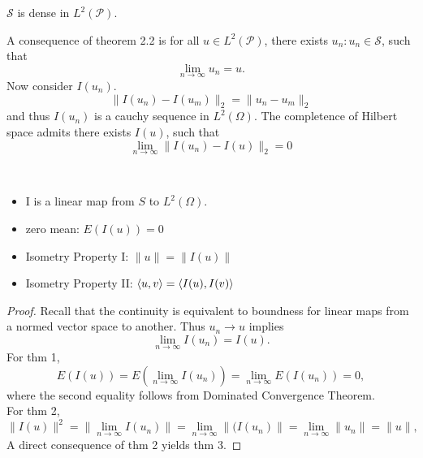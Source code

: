 \documentclass[12pt]{book}
\begin{document}
\begin{theorem}
$\mathcal S$ is dense in $L^2(\mathcal P)$.
\end{theorem}
\begin{remark}
A consequence of theorem 2.2 is for all $u \in L^2(\mathcal P)$, there exists ${u_n:u_n \in \mathcal S}$, such that 
$$
\lim_{n \to \infty} u_n = u.
$$
Now consider ${I(u_n)}$.
$$
\| I(u_n)-I(u_m)\|_2 = \| u_n - u_m\|_2
$$
and thus $I(u_n)$ is a cauchy sequence in $L^2(\Omega)$. The completence of Hilbert space admits there exists $I(u)$, such that 
$$
\lim_{n \to \infty} \| I(u_n) - I(u) \|_2 = 0
$$
\end{remark}


\begin{theorem} \ \\
\begin{itemize}
	\item I is a linear map from $S$ to $L^2(\Omega)$.
	\item zero mean: $E(I(u))=0$
	\item Isometry Property I: $\| u\| = \| I(u)\|$
	\item Isometry Property II: ${\langle u,v\rangle}={\langle I(u),I(v)\rangle}$
\end{itemize}
\end{theorem}
\begin{proof}
Recall that the continuity is equivalent to boundness for linear maps from a normed vector space to another. Thus $u_n \to u$ implies
$$
\lim_{n\to \infty} I(u_n) = I(u).
$$
For thm 1,
$$
E(I(u)) = E(\lim_{n\to \infty} I(u_n)) = \lim_{n \to \infty}E(I(u_n))=0,
$$	
where the second equality follows from Dominated Convergence Theorem. \\
For thm 2,
$$
\| I(u) \|^2 =  \|\lim_{n\to \infty} I(u_n) \| = \lim_{n \to \infty}\|(I(u_n)\|=\lim_{n \to \infty}\| u_n\|=\| u\|,
$$
A direct consequence of thm 2 yields thm 3. 
\end{proof}
\end{document}
